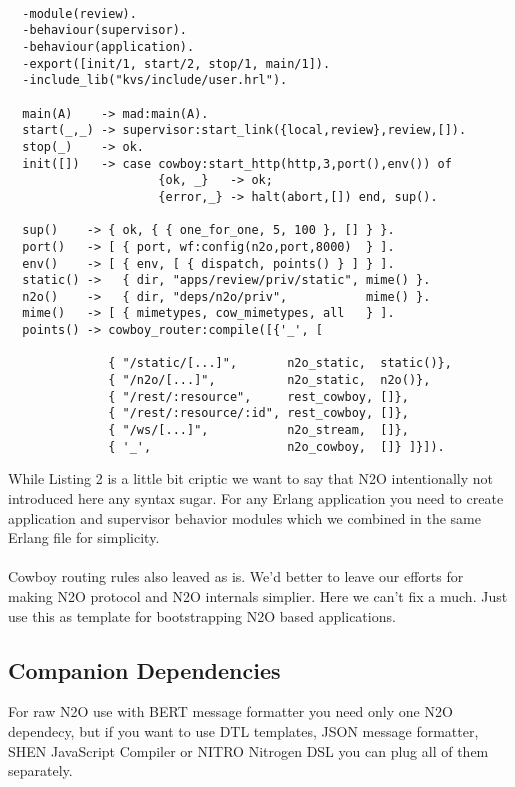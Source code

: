 \vspace{1\baselineskip}
\begin{lstlisting}[caption=review.erl]

  -module(review).
  -behaviour(supervisor).
  -behaviour(application).
  -export([init/1, start/2, stop/1, main/1]).
  -include_lib("kvs/include/user.hrl").

  main(A)    -> mad:main(A).
  start(_,_) -> supervisor:start_link({local,review},review,[]).
  stop(_)    -> ok.
  init([])   -> case cowboy:start_http(http,3,port(),env()) of
                     {ok, _}   -> ok;
                     {error,_} -> halt(abort,[]) end, sup().

  sup()    -> { ok, { { one_for_one, 5, 100 }, [] } }.
  port()   -> [ { port, wf:config(n2o,port,8000)  } ].
  env()    -> [ { env, [ { dispatch, points() } ] } ].
  static() ->   { dir, "apps/review/priv/static", mime() }.
  n2o()    ->   { dir, "deps/n2o/priv",           mime() }.
  mime()   -> [ { mimetypes, cow_mimetypes, all   } ].
  points() -> cowboy_router:compile([{'_', [

              { "/static/[...]",       n2o_static,  static()},
              { "/n2o/[...]",          n2o_static,  n2o()},
              { "/rest/:resource",     rest_cowboy, []},
              { "/rest/:resource/:id", rest_cowboy, []},
              { "/ws/[...]",           n2o_stream,  []},
              { '_',                   n2o_cowboy,  []} ]}]).
\end{lstlisting}
\vspace{1\baselineskip}

\newpage
While Listing 2 is a little bit criptic we want to say that N2O
intentionally not introduced here any syntax sugar.
For any Erlang application you need to create application
and supervisor behavior modules which we combined in the
same Erlang file for simplicity.

\paragraph{}
Cowboy routing rules also leaved as is.
We'd better to leave our efforts for making N2O protocol
and N2O internals simplier. Here we can't fix a much. Just use this
as template for bootstrapping N2O based applications.

\subsection{Companion Dependencies}
For raw N2O use with BERT message formatter you need only
one N2O dependecy, but if you want to use DTL templates,
JSON message formatter, SHEN JavaScript Compiler or NITRO
Nitrogen DSL you can plug all of them separately.

